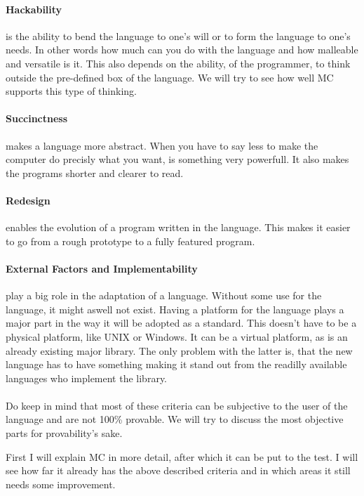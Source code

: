 \begin{multicols}{2}
\paragraph{Hackability}
is the ability to bend the language to one's will or to form the language to one's needs.
 In other words how much can you do with the language and how malleable and versatile is it.
 This also depends on the ability, of the programmer, to think outside the pre-defined box of the language.
 We will try to see how well MC supports this type of thinking.

\paragraph{Succinctness}
makes a language more abstract.
 When you have to say less to make the computer do precisly what you want, is something very powerfull.
 It also makes the programs shorter and clearer to read.

\paragraph{Redesign}
enables the evolution of a program written in the language.
 This makes it easier to go from a rough prototype to a fully featured program.

\paragraph{External Factors and Implementability}
play a big role in the adaptation of a language.
 Without some use for the language, it might aswell not exist.
 Having a platform for the language plays a major part in the way it will be adopted as a standard.
 This doesn't have to be a physical platform, like UNIX or Windows.
 It can be a virtual platform, as is an already existing major library.
 The only problem with the latter is, that the new language has to have something making it stand out from the readilly available languages who implement the library.

\paragraph{}
Do keep in mind that most of these criteria can be subjective to the user of the language and are not 100\% provable.
 We will try to discuss the most objective parts for provability's sake.

First I will explain MC in more detail, after which it can be put to the test.
 I will see how far it already has the above described criteria and in which areas it still needs some improvement.

\end{multicols}

